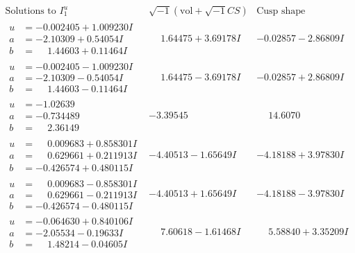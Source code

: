 \documentclass[1p]{elsarticle_modified}
\theoremstyle{definition}
\newcommand{\I}{\sqrt{-1}}
\begin{document}
$$\begin{array}{c|c|c}  
\text{Solutions to }I^u_{1}& \I (\text{vol} + \sqrt{-1}CS) & \text{Cusp shape}\\
 \hline 
\begin{aligned}
u &= -0.002405 + 1.009230 I \\
a &= -2.10309 + 0.54054 I \\
b &= \phantom{-}1.44603 + 0.11464 I\end{aligned}
 & \phantom{-}1.64475 + 3.69178 I & -0.02857 - 2.86809 I \\ \hline\begin{aligned}
u &= -0.002405 - 1.009230 I \\
a &= -2.10309 - 0.54054 I \\
b &= \phantom{-}1.44603 - 0.11464 I\end{aligned}
 & \phantom{-}1.64475 - 3.69178 I & -0.02857 + 2.86809 I \\ \hline\begin{aligned}
u &= -1.02639\phantom{ +0.000000I} \\
a &= -0.734489\phantom{ +0.000000I} \\
b &= \phantom{-}2.36149\phantom{ +0.000000I}\end{aligned}
 & -3.39545\phantom{ +0.000000I} & \phantom{-}14.6070\phantom{ +0.000000I} \\ \hline\begin{aligned}
u &= \phantom{-}0.009683 + 0.858301 I \\
a &= \phantom{-}0.629661 + 0.211913 I \\
b &= -0.426574 + 0.480115 I\end{aligned}
 & -4.40513 - 1.65649 I & -4.18188 + 3.97830 I \\ \hline\begin{aligned}
u &= \phantom{-}0.009683 - 0.858301 I \\
a &= \phantom{-}0.629661 - 0.211913 I \\
b &= -0.426574 - 0.480115 I\end{aligned}
 & -4.40513 + 1.65649 I & -4.18188 - 3.97830 I \\ \hline\begin{aligned}
u &= -0.064630 + 0.840106 I \\
a &= -2.05534 - 0.19633 I \\
b &= \phantom{-}1.48214 - 0.04605 I\end{aligned}
 & \phantom{-}7.60618 - 1.61468 I & \phantom{-}5.58840 + 3.35209 I \\ \hline\begin{aligned}

\end{aligned}
\end{array}$$
\end{document}
